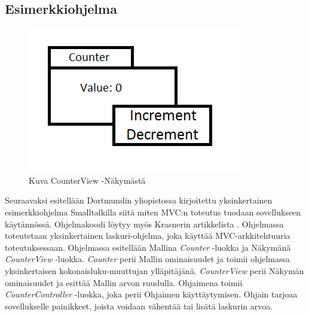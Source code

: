 \documentclass[utf8]{gradu3}
\begin{document}
\subsection{Esimerkkiohjelma}
\begin{figure}[h]
\centering
\includegraphics[scale=0.85]{counter.png}
\caption{Kuva CounterView -Näkymästä \parencite{krasner_desc}}
\end{figure}

Seuraavaksi esitellään  Dortmundin yliopistossa kirjoitettu yksinkertainen esimerkkiohjelma Smalltalkilla siitä miten MVC:n toteutus tuodaan sovellukseen käytännössä. Ohjelmakoodi löytyy myös Krasnerin artikkelista \parencite[s. 20]{krasner_desc}. Ohjelmassa toteutetaan yksinkertainen laskuri-ohjelma, joka käyttää MVC-arkkitehtuuria toteutuksessaan. Ohjelmassa esitellään Mallina \emph{Counter} -luokka ja Näkymänä \emph{CounterView} -luokka. \emph{Counter} perii Mallin ominaisuudet ja
toimii ohjelmassa yksinkertaisen kokonaisluku-muuttujan ylläpitäjänä. \emph{CounterView} perii Näkymän ominaisuudet ja esittää Mallin arvon ruudulla.
Ohjaimena toimii \emph{CounterController} -luokka, joka perii Ohjaimen käyttäytymisen. Ohjain tarjoaa sovellukselle painikkeet, joista voidaan vähentää
tai lisätä laskurin arvoa.
\end{document}

